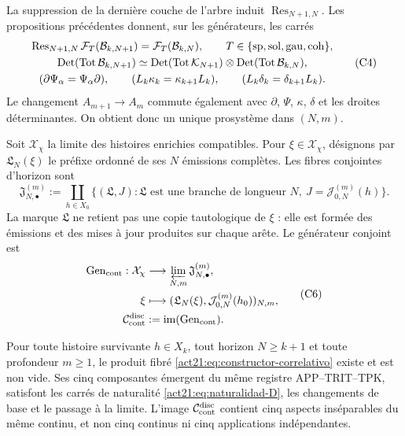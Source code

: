 La suppression de la dernière couche de l'arbre induit
\(\operatorname{Res}_{N+1,N}\). Les propositions précédentes donnent, sur les
générateurs, les carrés
\[
\begin{gathered}
 \operatorname{Res}_{N+1,N}\mathcal F_T(\mathcal B_{k,N+1})
 =\mathcal F_T(\mathcal B_{k,N}),
 \qquad T\in\{{\rm sp},{\rm sol},{\rm gau},{\rm coh}\},\\
 \operatorname{Det}(\operatorname{Tot}\mathcal B_{k,N+1})
 \simeq
 \operatorname{Det}(\operatorname{Tot}\mathcal K_{N+1})
 \otimes
 \operatorname{Det}(\operatorname{Tot}\mathcal B_{k,N}),\\
 (\partial\Psi_\alpha=\Psi_\alpha\partial),\qquad
 (L_k\kappa_k=\kappa_{k+1}L_k),\qquad
 (L_k\delta_k=\delta_{k+1}L_k).
\end{gathered}
 \tag{C4}
 \label{act21:eq:naturalidad-D}
\]
Le changement \(A_{m+1}\to A_m\) commute également avec \(\partial\), \(\Psi\),
\(\kappa\), \(\delta\) et les droites déterminantes. On obtient donc
un unique prosystème dans \((N,m)\).

Soit \(\mathcal X_\chi\) la limite des histoires enrichies compatibles. Pour \(\xi\in\mathcal X_\chi\), désignons par \(\mathfrak L_N(\xi)\) le préfixe ordonné de ses \(N\) émissions complètes. Les fibres conjointes d'horizon sont
\[
 \mathfrak J_{N,\bullet}^{(m)}
 :=\coprod_{h\in X_0}
 \{(\mathfrak L,J):\mathfrak L\text{ est une branche de longueur }N,
       \ J=\mathcal J_{0,N}^{(m)}(h)\}.
 \tag{C5}
 \label{act21:eq:fibras-conjuntas-horizonte}
\]
La marque \(\mathfrak L\) ne retient pas une copie tautologique de \(\xi\) : elle est
formée des émissions et des mises à jour produites sur chaque arête. Le
générateur conjoint est
\[
\begin{aligned}
 \operatorname{Gen}_{\rm cont}:\mathcal X_\chi
   &\longrightarrow\varprojlim_{N,m}\mathfrak J_{N,\bullet}^{(m)},\\
 \xi&\longmapsto
   (\mathfrak L_N(\xi),\mathcal J_{0,N}^{(m)}(h_0))_{N,m},\\
 \mathcal C_{\rm cont}^{\rm disc}
   &:=\operatorname{im}(\operatorname{Gen}_{\rm cont}).
\end{aligned}
 \tag{C6}
 \label{act21:eq:continuo-discreto}
\]

\begin{theorem}
\label{act21:thm:correlacion-cinco}
Pour toute histoire survivante \(h\in X_k\), tout horizon
\(N\geq k+1\) et toute profondeur \(m\geq1\), le produit fibré
\eqref{act21:eq:constructor-correlativo} existe et est non vide. Ses cinq
composantes émergent du même registre APP--TRIT--TPK, satisfont les
carrés de naturalité \eqref{act21:eq:naturalidad-D}, les changements de base et le
passage à la limite. L'image \(\mathcal C_{\rm cont}^{\rm disc}\) contient cinq
aspects inséparables du même continu, et non cinq continus ni cinq
applications indépendantes.
\end{theorem}


